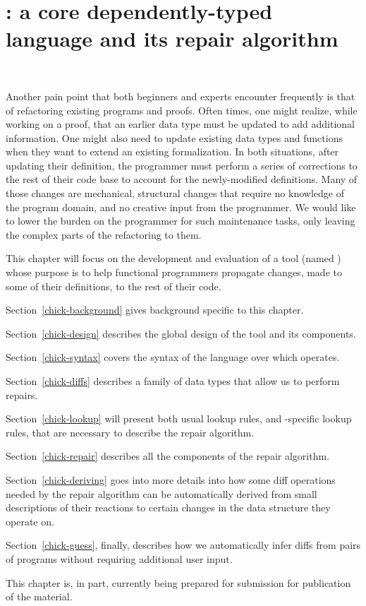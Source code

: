\chapter{\Chick{}: a core dependently-typed language and its repair
algorithm}~\label{chick}

Another pain point that both beginners and experts encounter frequently is that
of refactoring existing programs and proofs.  Often times, one might realize,
while working on a proof, that an earlier data type must be updated to add
additional information.  One might also need to update existing data types and
functions when they want to extend an existing formalization.  In both
situations, after updating their definition, the programmer must perform a
series of corrections to the rest of their code base to account for the
newly-modified definitions.  Many of those changes are mechanical, structural
changes that require no knowledge of the program domain, and no creative input
from the programmer.  We would like to lower the burden on the programmer for
such maintenance tasks, only leaving the complex parts of the refactoring to
them.

This chapter will focus on the development and evaluation of a tool (named
\Chick{}\footnotemark{}) whose purpose is to help functional programmers
propagate changes, made to some of their definitions, to the rest of their code.


Section~\ref{chick-background} gives background specific to this chapter.

Section~\ref{chick-design} describes the global design of the tool and its
components.

Section~\ref{chick-syntax} covers the syntax of the language over which \Chick{}
operates.

Section~\ref{chick-diffs} describes a family of data types that allow us to
perform repairs.

Section~\ref{chick-lookup} will present both usual lookup rules, and
\Chick{}-specific lookup rules, that are necessary to describe the repair
algorithm.

Section~\ref{chick-repair} describes all the components of the repair algorithm.

Section~\ref{chick-deriving} goes into more details into how some diff
operations needed by the repair algorithm can be automatically derived from
small descriptions of their reactions to certain changes in the data structure
they operate on.

Section~\ref{chick-guess}, finally, describes how we automatically infer diffs
from pairs of programs without requiring additional user input.










This chapter is, in part, currently being prepared for submission for
publication of the material.
